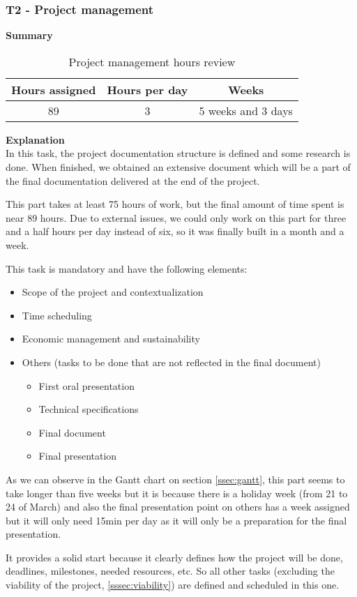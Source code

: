 \subsubsection{T2 - Project management}
\label{sssec:projectManagement}

\textbf{Summary}
\begin{table}[ht]
\centering
  \begin{tabular}{| c | c | c |}
  \hline Hours assigned & Hours per day & Weeks \\ \hline  
   89 & 3 & 5 weeks and 3 days        \\ \hline
  \end{tabular}
  \caption{Project management hours review} \vspace{3pt}
  \label{tab:projectManagement}
\end{table}

\par{\textbf{Explanation}}\\
In this task, the project documentation structure is defined and some research is done. When finished, we obtained an extensive document which will be a part of the final documentation delivered at the end of the project.

This part takes at least 75 hours of work, but the final amount of time spent is near 89 hours. Due to external issues, we could only work on this part for three and a half hours per day instead of six, so it was finally built in a month and a week. 

This task is mandatory and have the following elements:
\begin{itemize}
\item Scope of the project and contextualization
\item Time scheduling
\item Economic management and sustainability
\item Others (tasks to be done that are not reflected in the final document)
\begin{itemize}
	\item First oral presentation
	\item Technical specifications
	\item Final document
	\item Final presentation
\end{itemize}
\end{itemize}

As we can observe in the Gantt chart on section \ref{ssec:gantt}, this part seems to take longer than five weeks but it is because there is a holiday week (from 21 to 24 of March) and also the final presentation point on others has a week assigned but it will only need 15min per day as it will only be a preparation for the final presentation.

It provides a solid start because it clearly defines how the project will be done, deadlines, milestones, needed resources, etc. So all other tasks (excluding the viability of the project, \ref{sssec:viability}) are defined and scheduled in this one.